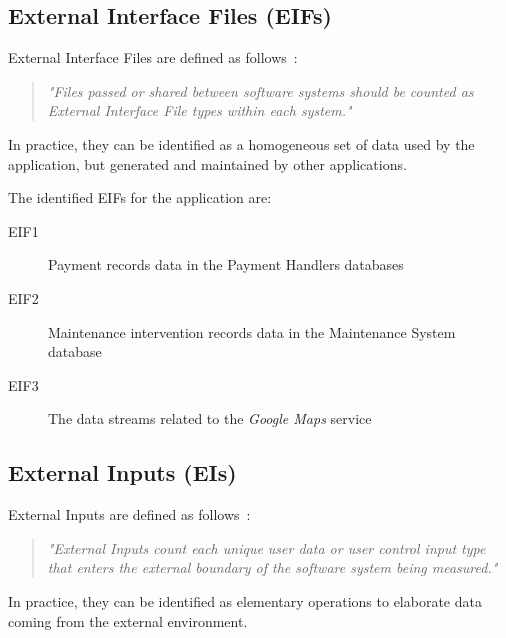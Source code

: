 \subsection{External Interface Files (EIFs)}
External Interface Files are defined as follows~\cite{cocomo-manual}:
\begin{quotation}
\textit{"Files passed or shared between software systems should be counted as External Interface File types within each system."}
\end{quotation}
In practice, they can be identified as a homogeneous set of data used by the application, but generated and maintained by other applications.

The identified EIFs for the application are:
\begin{description}
\item[EIF1] Payment records data in the Payment Handlers databases %
\item[EIF2] Maintenance intervention records data in the Maintenance System database %
\item[EIF3] The data streams related to the \textit{Google Maps} service %
\end{description}

\subsection{External Inputs (EIs)}
External Inputs are defined as follows~\cite{cocomo-manual}:
\begin{quotation}
\textit{"External Inputs count each unique user data or user control input type that enters the external boundary of the software system being measured."}
\end{quotation}
In practice, they can be identified as elementary operations to elaborate data coming from the external environment.

